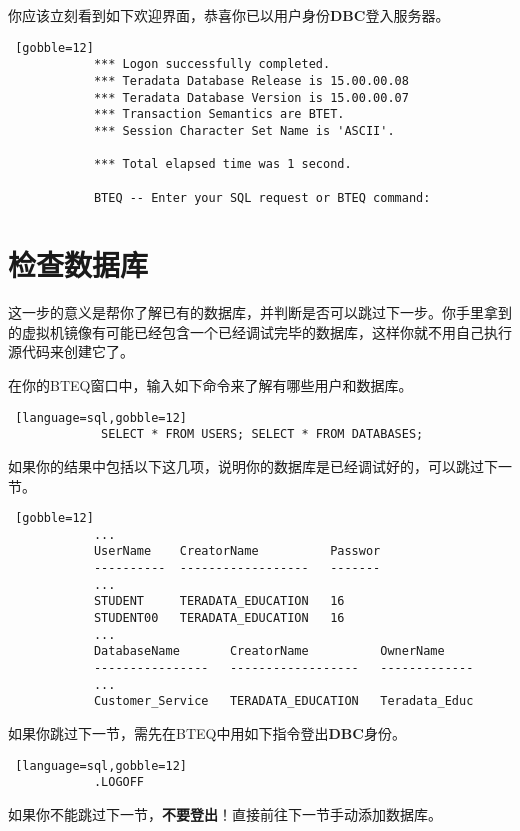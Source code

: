 \documentclass{article}
\begin{document}
		你应该立刻看到如下欢迎界面，恭喜你已以用户身份\textbf{DBC}登入服务器。

		\begin{lstlisting} [gobble=12]
			*** Logon successfully completed.               
			*** Teradata Database Release is 15.00.00.08    
			*** Teradata Database Version is 15.00.00.07    
			*** Transaction Semantics are BTET.             
			*** Session Character Set Name is 'ASCII'.      
			                                                
			*** Total elapsed time was 1 second.            
			                                                
			BTEQ -- Enter your SQL request or BTEQ command: 
		\end{lstlisting}

	\section{检查数据库} %

		这一步的意义是帮你了解已有的数据库，并判断是否可以跳过下一步。你手里拿到的虚拟机镜像有可能已经包含一个已经调试完毕的数据库，这样你就不用自己执行源代码来创建它了。

		在你的BTEQ窗口中，输入如下命令来了解有哪些用户和数据库。

		\begin{lstlisting} [language=sql,gobble=12]
			 SELECT * FROM USERS; SELECT * FROM DATABASES;
		\end{lstlisting}

		如果你的结果中包括以下这几项，说明你的数据库是已经调试好的，可以跳过下一节。
		\begin{lstlisting} [gobble=12]
			...
			UserName    CreatorName          Passwor
			----------  ------------------   -------
			...
			STUDENT     TERADATA_EDUCATION   16
			STUDENT00   TERADATA_EDUCATION   16
			...
			DatabaseName       CreatorName          OwnerName
			----------------   ------------------   -------------
			...
			Customer_Service   TERADATA_EDUCATION   Teradata_Educ
		\end{lstlisting}

		如果你跳过下一节，需先在BTEQ中用如下指令登出\textbf{DBC}身份。

		\begin{lstlisting} [language=sql,gobble=12]
			.LOGOFF
		\end{lstlisting}

		
		如果你不能跳过下一节，\textbf{不要登出}！直接前往下一节手动添加数据库。
\end{document}
